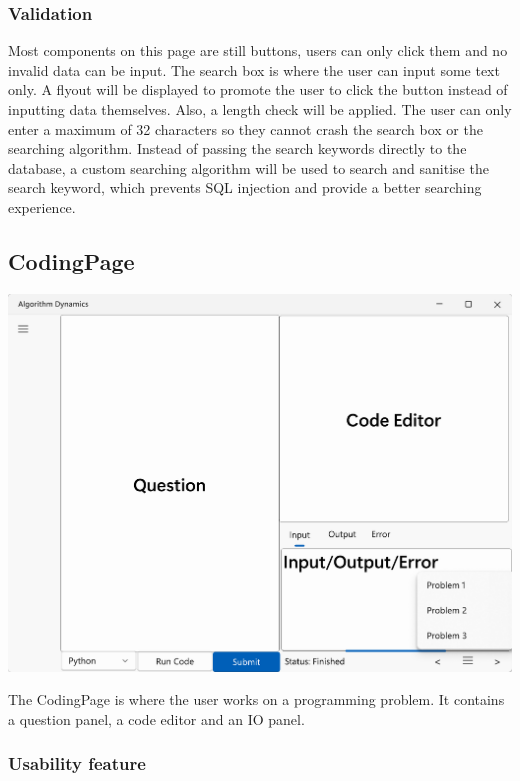 \documentclass[a4paper]{report}
\begin{document}
\subsubsection{Validation}

Most components on this page are still buttons, users can only click them and no invalid data can be input. The search box is where the user can input some text only. A flyout will be displayed to promote the user to click the button instead of inputting data themselves. Also, a length check will be applied. The user can only enter a maximum of 32 characters so they cannot crash the search box or the searching algorithm. Instead of passing the search keywords directly to the database, a custom searching algorithm will be used to search and sanitise the search keyword, which prevents SQL injection and provide a better searching experience.

\subsection{CodingPage}

\includegraphics[width=\textwidth, height=\textheight, keepaspectratio]{CodingPage-design}

The CodingPage is where the user works on a programming problem. It contains a question panel, a code editor and an IO panel.

\subsubsection{Usability feature}
\end{document}

